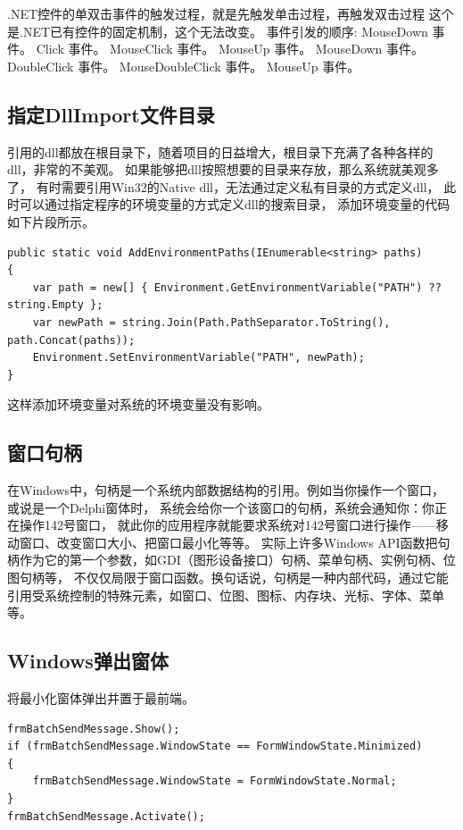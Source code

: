 \documentclass{book}
\begin{document}
.NET控件的单双击事件的触发过程，就是先触发单击过程，再触发双击过程
这个是.NET已有控件的固定机制，这个无法改变。
事件引发的顺序:
MouseDown 事件。
Click 事件。
MouseClick 事件。
MouseUp 事件。
MouseDown 事件。
DoubleClick 事件。
MouseDoubleClick 事件。
MouseUp 事件。

\subsection{指定DllImport文件目录}

引用的dll都放在根目录下，随着项目的日益增大，根目录下充满了各种各样的dll，非常的不美观。
如果能够把dll按照想要的目录来存放，那么系统就美观多了，
有时需要引用Win32的Native dll，无法通过定义私有目录的方式定义dll，
此时可以通过指定程序的环境变量的方式定义dll的搜索目录，
添加环境变量的代码如下片段所示。

\begin{lstlisting}[language={[Sharp]C}]
public static void AddEnvironmentPaths(IEnumerable<string> paths)
{
	var path = new[] { Environment.GetEnvironmentVariable("PATH") ?? string.Empty };
	var newPath = string.Join(Path.PathSeparator.ToString(), path.Concat(paths));
	Environment.SetEnvironmentVariable("PATH", newPath);
}
\end{lstlisting}

这样添加环境变量对系统的环境变量没有影响。

\subsection{窗口句柄}

在Windows中，句柄是一个系统内部数据结构的引用。例如当你操作一个窗口，或说是一个Delphi窗体时，
系统会给你一个该窗口的句柄，系统会通知你：你正在操作142号窗口，
就此你的应用程序就能要求系统对142号窗口进行操作——移动窗口、改变窗口大小、把窗口最小化等等。
实际上许多Windows API函数把句柄作为它的第一个参数，如GDI（图形设备接口）句柄、菜单句柄、实例句柄、位图句柄等，
不仅仅局限于窗口函数。换句话说，句柄是一种内部代码，通过它能引用受系统控制的特殊元素，如窗口、位图、图标、内存块、光标、字体、菜单等。

\subsection{Windows弹出窗体}

将最小化窗体弹出并置于最前端。

\begin{lstlisting}[language={[Sharp]C}]
frmBatchSendMessage.Show();
if (frmBatchSendMessage.WindowState == FormWindowState.Minimized)
{
	frmBatchSendMessage.WindowState = FormWindowState.Normal;
}
frmBatchSendMessage.Activate();
\end{lstlisting}
\end{document}
